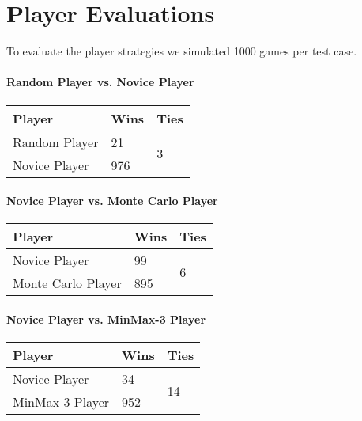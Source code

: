 \chapter{Player Evaluations}
\label{ch:evaluations}
To evaluate the player strategies we simulated 1000 games per test case.
\subsubsection*{Random Player vs. Novice Player}
\begin{table}[h]
	\centering
	\begin{tabular}[h]{l|l|l}
		\textbf{Player} & \textbf{Wins} & \textbf{Ties}\\
		\hline
		Random Player & 21 & \multirow{2}{*}{3}	\\
		Novice Player & 976 &	\\
	\end{tabular}
\end{table}
\subsubsection*{Novice Player vs. Monte Carlo Player}
\begin{table}[h]
	\centering
	\begin{tabular}[h]{l|l|l}
		\textbf{Player} & \textbf{Wins} & \textbf{Ties}\\
		\hline
		Novice Player & 99 & \multirow{2}{*}{6}	\\
		Monte Carlo Player & 895 &	\\
	\end{tabular}
\end{table}
\subsubsection*{Novice Player vs. MinMax-3 Player}
\begin{table}[h]
	\centering
	\begin{tabular}[h]{l|l|l}
		\textbf{Player} & \textbf{Wins} & \textbf{Ties}\\
		\hline
		Novice Player & 34 & \multirow{2}{*}{14}	\\
		MinMax-3 Player & 952 &	\\
	\end{tabular}
\end{table}
